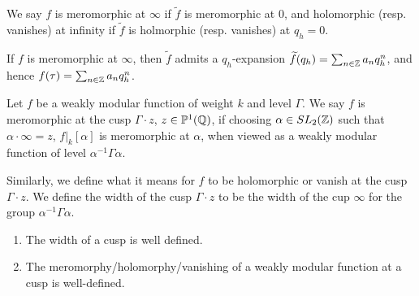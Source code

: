 \documentclass[10pt,a4paper]{article}
\begin{document}
\begin{definition}
  We say $f$ is meromorphic at $\infty$ if $\tilde{f}$ is meromorphic at $0$, and holomorphic (resp. vanishes) at infinity if $\tilde{f}$ is holmorphic (resp. vanishes) at $q_h = 0$.

  If $f$ is meromorphic at $\infty$, then $\tilde{f}$ admits a $q_h$-expansion $\widetilde{f}(q_h) = \sum_{n \in \mathbb{Z}} a_n q_h^n$, and hence $f(\tau) = \sum_{n \in \mathbb{Z}} a_n q_h^n$.
\end{definition}
\begin{definition}
  Let $f$ be a weakly modular function of weight $k$ and level $\Gamma$. We say $f$ is meromorphic at the cusp $\Gamma \cdot z$, $z \in \mathbb{P}^1(\mathbb{Q})$, if choosing $\alpha  \in SL_2(\mathbb{Z})$ such that $\alpha \cdot \infty = z$, $f|_k[\alpha]$ is meromorphic at $\alpha$, when viewed as a weakly modular function of level $\alpha^{-1}\Gamma\alpha$.

  Similarly, we define what it means for $f$ to be holomorphic or vanish at the cusp $\Gamma\cdot z$. We define the width of the cusp $\Gamma \cdot z$ to be the width of the cup $\infty$ for the group $\alpha^{-1}\Gamma \alpha$.
\end{definition}
\begin{lemma}\hspace*{0cm}
  \begin{enumerate}
    \item The width of a cusp is well defined.
    \item The meromorphy/holomorphy/vanishing of a weakly modular function at a cusp is well-defined.
  \end{enumerate}
\end{lemma}
\end{document}

